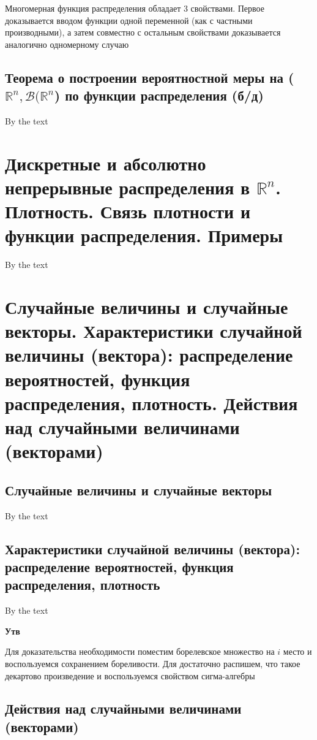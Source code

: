 \documentclass[a4paper, 14pt]{article}
\begin{document}
    Многомерная функция распределения обладает 3 свойствами.
    Первое доказывается вводом функции одной переменной (как с частными производными), а затем совместно с остальным
    свойствами доказывается аналогично одномерному случаю
    
    \subsection{Теорема о построении вероятностной меры на ($\mathbb{R}^n, \mathcal{B}(\mathbb{R}^n$) по функции
    распределения (б/д)}
    
    By the text
    
    \section{Дискретные и абсолютно непрерывные распределения в $\mathbb{R}^n$.
    Плотность.
    Связь плотности и функции распределения.
    Примеры}
    
    By the text
    
    \section{Случайные величины и случайные векторы.
    Характеристики случайной величины (вектора): распределение вероятностей, функция распределения, плотность.
    Действия над случайными величинами (векторами)}
    
    \subsection{Случайные величины и случайные векторы}
    
    By the text
    
    \subsection{Характеристики случайной величины (вектора): распределение вероятностей, функция распределения, плотность}
    
    By the text
    
    \textbf{Утв}
    
    Для доказательства необходимости поместим борелевское множество на $i$ место и воспользуемся сохранением
    бореливости.
    Для достаточно распишем, что такое декартово произведение и воспользуемся свойством сигма-алгебры
    
    \subsection{Действия над случайными величинами (векторами)}
    
\end{document}
